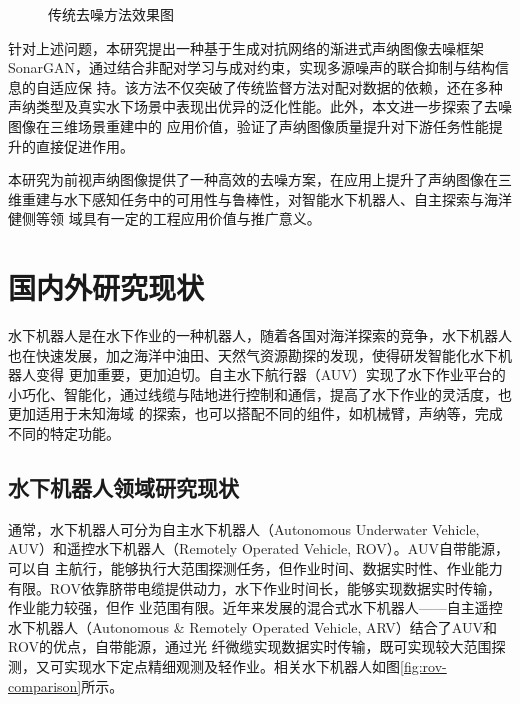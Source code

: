 \begin{figure}[!ht]
  \caption{传统去噪方法效果图}
  \label{fig:传统去噪方法效果图}
\end{figure}

针对上述问题，本研究提出一种基于生成对抗网络的渐进式声纳图像去噪框架 SonarGAN，通过结合非配对学习与成对约束，实现多源噪声的联合抑制与结构信息的自适应保
持。该方法不仅突破了传统监督方法对配对数据的依赖，还在多种声纳类型及真实水下场景中表现出优异的泛化性能。此外，本文进一步探索了去噪图像在三维场景重建中的
应用价值，验证了声纳图像质量提升对下游任务性能提升的直接促进作用。

本研究为前视声纳图像提供了一种高效的去噪方案，在应用上提升了声纳图像在三维重建与水下感知任务中的可用性与鲁棒性，对智能水下机器人、自主探索与海洋健侧等领
域具有一定的工程应用价值与推广意义。


\section{国内外研究现状}

水下机器人是在水下作业的一种机器人，随着各国对海洋探索的竞争，水下机器人也在快速发展，加之海洋中油田、天然气资源勘探的发现，使得研发智能化水下机器人变得
更加重要，更加迫切。自主水下航行器（AUV）实现了水下作业平台的小巧化、智能化，通过线缆与陆地进行控制和通信，提高了水下作业的灵活度，也更加适用于未知海域
的探索，也可以搭配不同的组件，如机械臂，声纳等，完成不同的特定功能。

\subsection{水下机器人领域研究现状}

通常，水下机器人可分为自主水下机器人（Autonomous Underwater Vehicle, AUV）和遥控水下机器人（Remotely Operated Vehicle, ROV）。AUV自带能源，可以自
主航行，能够执行大范围探测任务，但作业时间、数据实时性、作业能力有限。ROV依靠脐带电缆提供动力，水下作业时间长，能够实现数据实时传输，作业能力较强，但作
业范围有限。近年来发展的混合式水下机器人——自主遥控水下机器人（Autonomous \& Remotely Operated Vehicle, ARV）结合了AUV和ROV的优点，自带能源，通过光
纤微缆实现数据实时传输，既可实现较大范围探测，又可实现水下定点精细观测及轻作业。相关水下机器人如图\ref{fig:rov-comparison}所示。

